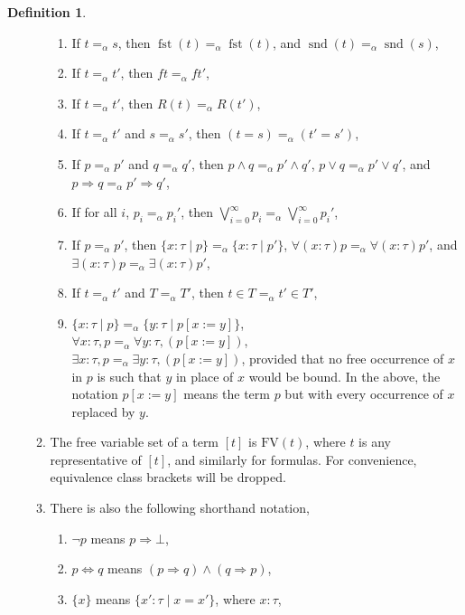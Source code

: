 \documentclass{birkjour}
\theoremstyle{plain}
\theoremstyle{definition}
\newtheorem{definition}[thm]{Definition} %
\begin{document}
\begin{definition}
\begin{enumerate}
\begin{enumerate}
\begin{enumerate}
					\item If $t =_\alpha s$, then $\operatorname{fst}(t) =_\alpha \operatorname{fst}(t)$, and $\operatorname{snd}(t) =_\alpha \operatorname{snd}(s)$,
					\item If $t =_\alpha t'$, then $ft =_\alpha ft'$,
					\item If $t =_\alpha t'$, then $R(t) =_\alpha R(t')$,
					\item If $t =_\alpha t'$ and $s =_\alpha s'$, then $(t = s) =_\alpha (t' = s')$,
					\item If $p =_\alpha p'$ and $q =_\alpha q'$, then $p \wedge q =_\alpha p' \wedge q'$, $p \vee q =_\alpha p' \vee q'$, and $p \Rightarrow q =_\alpha p' \Rightarrow q'$,
					\item If for all $i$, $p_i =_\alpha p_i'$, then $\bigvee_{i = 0}^\infty p_i =_\alpha \bigvee_{i = 0}^\infty p_i'$,
					\item If $p =_\alpha p'$, then $\lbrace x : \tau\mid p\rbrace =_\alpha \lbrace x : \tau \mid p'\rbrace$, $\forall (x : \tau)p =_\alpha \forall (x : \tau)p'$, and $\exists (x : \tau)p =_\alpha \exists(x : \tau)p'$,
					\item If $t =_\alpha t'$ and $T =_\alpha T'$, then $t \in T =_\alpha t' \in T'$,
					\item $\lbrace x : \tau \mid p\rbrace =_\alpha \lbrace y : \tau \mid p[x:=y]\rbrace$,\\
					$\forall x : \tau,p =_\alpha \forall y : \tau,(p[x:= y])$,\\
					$\exists x : \tau,p =_\alpha \exists y : \tau,(p[x :=y])$, provided that no free occurrence of $x$ in $p$ is such that $y$ in place of $x$ would be bound. In the above, the notation $p[x:=y]$ means the term $p$ but with every occurrence of $x$ replaced by $y$.
				\end{enumerate}
				\item The free variable set of a term $[t]$ is $\text{FV}(t)$, where $t$ is any representative of $[t]$, and similarly for formulas. For convenience, equivalence class brackets will be dropped.
				\item There is also the following shorthand notation,
				\begin{enumerate}
					\item $\neg p$ means $p \Rightarrow \bot$,
					\item $p \Leftrightarrow q$ means $(p \Rightarrow q) \wedge (q \Rightarrow p)$,
					\item $\lbrace x \rbrace$ means $\lbrace x' : \tau \mid x = x'\rbrace$, where $x : \tau$,

\end{enumerate}
\end{enumerate}
\end{enumerate}
\end{definition}
\end{document}
